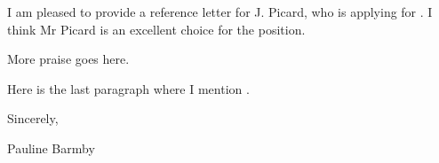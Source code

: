 \documentclass[12pt]{article}
\begin{document}
\thispagestyle{empty}

\vspace*{-1.2in}
\noindent 
\uwoltrhd

\vskip 0.4in

\noindent
\addressee
\retaddress

\vskip 0.2in
\noindent
\dear

\vskip 0.05in

I am pleased to provide a reference letter for J. Picard, who is applying for \posname.
I think Mr Picard is an excellent choice
for the position.

More praise goes here.

Here is the last paragraph where I mention \yourplace.



\vskip0.4in 

\noindent
Sincerely,
\vskip 0.1in
\hskip-0.45in

\noindent
Pauline Barmby
\end{document}
